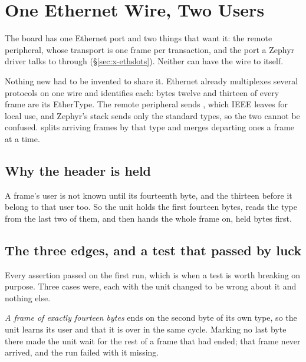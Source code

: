 \section{One Ethernet Wire, Two Users}
\label{sec:x-ethshare}

The board has one Ethernet port and two things that want it: the
remote peripheral, whose transport is one frame per transaction, and
the port a Zephyr driver talks to through 
(\S\ref{sec:x-ethslots}). Neither can have the wire to itself.

Nothing new had to be invented to share it. Ethernet already multiplexes
several protocols on one wire and identifies each: bytes twelve
and thirteen of every frame are its EtherType. The remote peripheral
sends , which IEEE leaves for local use, and Zephyr's
stack sends only the standard types, so the two cannot be confused.
 splits arriving frames by that type and merges
departing ones a frame at a time.

\subsection{Why the header is held}

A frame's user is not known until its fourteenth byte, and the
thirteen before it belong to that user too. So the unit holds the
first fourteen bytes, reads the type from the last two of them, and
then hands the whole frame on, held bytes first.



\subsection{The three edges, and a test that passed by luck}

Every assertion passed on the first run, which is when a test is
worth breaking on purpose. Three cases were, each with the unit
changed to be wrong about it and nothing else.

\emph{A frame of exactly fourteen bytes} ends on the second byte of
its own type, so the unit learns its user and that it is over in the
same cycle. Marking no last byte there made the unit wait for the
rest of a frame that had ended; that frame never arrived, and the run
failed with it missing.

